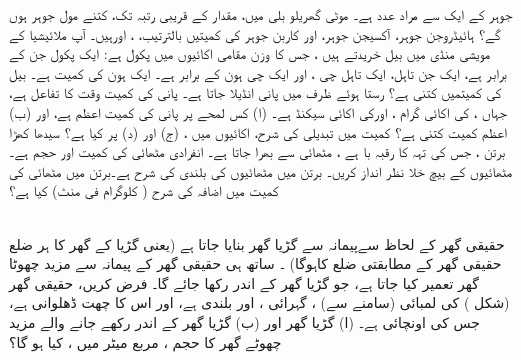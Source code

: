 جوہر کے  ایک   سے مراد عدد  ہے۔  موٹی گھریلو بلی میں، مقدار کے قریبی رتبہ تک،  کتنے  مول  جوہر  ہوں گے؟ ہائیڈروجن جوہر، آکسیجن جوہر، اور کاربن جوہر کی کمیتیں بالترتیب،
 ، اورہیں۔ 
آپ ملائیشیا کے مویشی منڈی میں  بیل خریدتے ہیں ، جس کا  وزن مقامی اکائیوں میں  پکول  ہے:  ایک پکول   جن کے برابر ہے،   ایک جن     تاہل، ایک تاہل     چی ، اور ایک چی  ہون  کے برابر ہے۔ ایک ہون کی کمیت ہے۔ بیل کی کمیتمیں کتنی ہے؟ 
رستا ہوئے ظرف میں پانی انڈیلا جاتا ہے۔ پانی کی کمیت وقت  کا تفاعل  ہے، جہاں ، کی اکائی گرام  ، اورکی اکائی سیکنڈ  ہے۔  (ا) کس لمحے پر  پانی کی کمیت  اعظم ہے، اور   (ب)   اعظم کمیت کتنی ہے؟  کمیت میں تبدیلی کی شرح،  اکائیوں میں ،  (ج) اور  (د)  پر  کیا ہے؟ 
 سیدھا کھڑا برتن ، جس کی تہہ  کا رقبہ با ہے ،   مٹھائی  سے بھرا جاتا ہے۔ انفرادی  مٹھائی کی کمیت اور حجم ہے۔ مٹھائیوں  کے بیچ  خلا نظر انداز کریں۔  برتن میں مٹھائیوں کی بلندی کی  شرح    ہے۔برتن میں  مٹھائی کی  کمیت میں اضافہ  کی شرح   ( کلوگرام فی منٹ) کیا ہے؟ 

\\
حقیقی گھر کے لحاظ سےپیمانہ   سے گڑیا  گھر بنایا جاتا ہے (یعنی گڑیا کے گھر کا ہر ضلع حقیقی  گھر کے مطابقتی ضلع کاہوگا)  ۔ ساتھ ہی حقیقی گھر کے پیمانہ سے  مزید چھوٹا گھر تعمیر کیا جاتا ہے، جو گڑیا  گھر کے اندر رکھا جائے گا۔ فرض کریں، حقیقی گھر (شکل )  کی لمبائی (سامنے سے)  ، گہرائی  ، اور بلندی  ہے،  اور اس کا چھت ڈھلوانی ہے،  جس کی اونچائی   ہے۔  (ا) گڑیا گھر  اور  (ب)  گڑیا گھر کے اندر رکھے جانے والے مزید چھوٹے گھر کا حجم  ، مربع میٹر میں  ، کیا ہو گا؟ 
